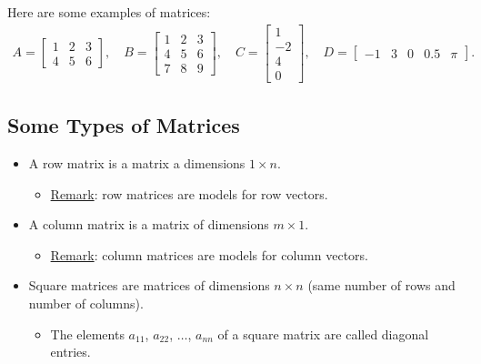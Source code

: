 \documentclass[12pt,a4paper]{article}
\newcounter{example}[section]
\begin{document}
\vspace*{12pt}

\begin{example}
Here are some examples of matrices:
	\begin{align*}
	A = \begin{bmatrix}
	1 & 2 & 3 \\
	4 & 5 & 6 
	\end{bmatrix} ,
	\quad
	B = \begin{bmatrix}
	1 & 2 & 3 \\
	4 & 5 & 6 \\
	7 & 8 & 9
	\end{bmatrix} ,
	\quad
	C = \begin{bmatrix}
	1 \\ -2 \\ 4 \\ 0 
	\end{bmatrix} , 
	\quad
	D = \begin{bmatrix}
	-1 & 3 & 0 & 0.5 & \pi 
	\end{bmatrix} .
	\end{align*}
\end{example}

\subsection{Some Types of Matrices}

\begin{itemize}
\item A row matrix is a matrix a dimensions $1 \times n$.
	\begin{itemize}
	\item \underline{Remark}: row matrices are models for row vectors.
	\end{itemize}
\item A column matrix is a matrix of dimensions $m \times 1$. 
	\begin{itemize}
	\item \underline{Remark}: column matrices are models for column vectors.
	\end{itemize}
\item Square matrices are matrices of dimensions $n \times n$ (same number of rows and number of columns). 
	\begin{itemize}
	\item The elements $a_{11}$, $a_{22}$, $\ldots$, $a_{nn}$ of a square matrix are called diagonal entries.
	\end{itemize}
\end{itemize}
\end{document}
